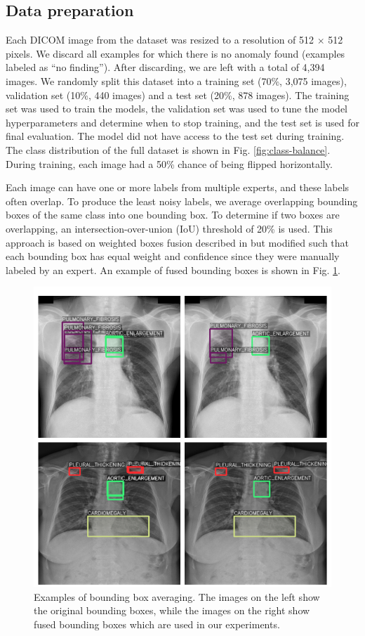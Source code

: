 \documentclass[conference]{IEEEtran}
\begin{document}
\subsection{Data preparation}

Each DICOM image from the dataset was resized to a resolution of 512 $\times$ 512 pixels. We 
discard all examples for which there is no anomaly found (examples labeled as ``no finding''). After 
discarding, we are left with a total of 4,394 images. We randomly split this dataset into a 
training set (70\%, 3,075 images), validation set (10\%, 440 images) and a test set (20\%, 878 
images). The training set was used to train the models, the validation set was used to tune the 
model hyperparameters and determine when to stop training, and the test set is used for final 
evaluation. The model did not have access to the test set during training. The class distribution
of the full dataset is shown in Fig. \ref{fig:class-balance}. During training, each image had 
a 50\% chance of being flipped horizontally.

Each image can have one or more 
labels from multiple experts, and these labels often overlap. To produce the least noisy labels, 
we average overlapping bounding boxes of the same class into one bounding box. 
To determine if two boxes are overlapping, an intersection-over-union 
(IoU) threshold of 20\% is used. This approach is based on weighted boxes fusion 
described in \cite{solovyevWeightedBoxesFusion2021} but modified such that each bounding box has 
equal weight and confidence since they were manually labeled by an expert. An example of fused 
bounding boxes is shown in Fig. \ref{fig:wbf}.

\begin{figure}[t]
\centering
\includegraphics[width=\columnwidth]{images/wbf}
\caption{Examples of bounding box averaging. The images on the left show the original bounding boxes, while the images on the right show fused bounding boxes which are used in our experiments.}
\label{fig:wbf}
\end{figure}
\end{document}
